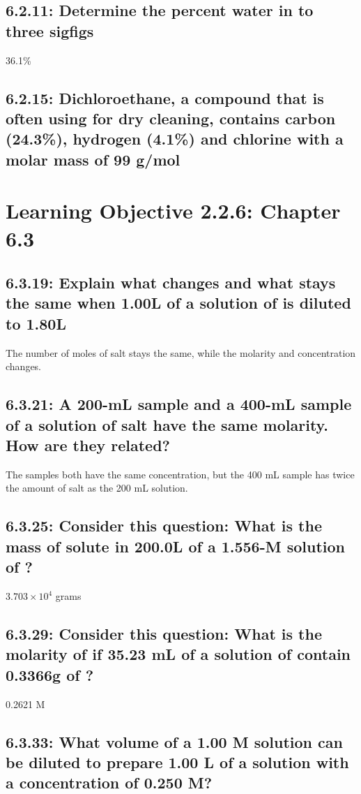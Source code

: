 \documentclass[11pt, letterpaper]{article}
\begin{document}
\subsection*{6.2.11: Determine the percent water in  to three sigfigs}
36.1\%
\subsection*{6.2.15: Dichloroethane, a compound that is often using for dry cleaning,
contains carbon (24.3\%), hydrogen (4.1\%) and chlorine with a molar mass of 99 g/mol}

\section*{Learning Objective 2.2.6: Chapter 6.3}
\subsection*{6.3.19: Explain what changes and what stays the same when 1.00L of a 
solution of  is diluted to 1.80L}
The number of moles of salt stays the same, while the molarity and concentration changes.

\subsection*{6.3.21: A 200-mL sample and a 400-mL sample of a solution of salt 
have the same molarity. How are they related?}

The samples both have the same concentration, but the 400 mL sample has twice the
amount of salt as the 200 mL solution.


\subsection*{6.3.25: Consider this question: What is the mass of solute in 200.0L
of a 1.556-M solution of ?}

$3.703 \times 10^{4}$ grams

\subsection*{6.3.29: Consider this question: What is the molarity of  
if 35.23 mL of a solution of  contain 0.3366g of ?}

0.2621 M

\subsection*{6.3.33: What volume of a 1.00 M  solution can be 
diluted to prepare 1.00 L of a solution with a concentration of 0.250 M?}
\end{document}
